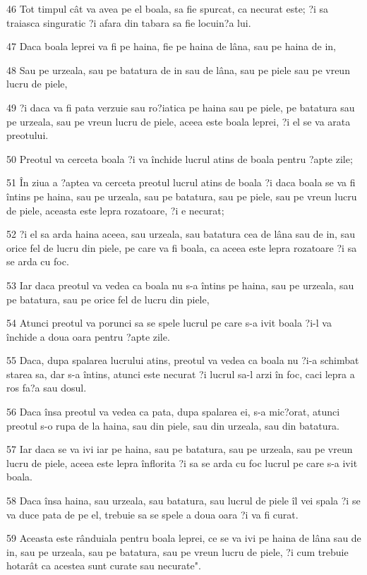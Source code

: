 \par 46 Tot timpul cât va avea pe el boala, sa fie spurcat, ca necurat este; ?i sa traiasca singuratic ?i afara din tabara sa fie locuin?a lui.
\par 47 Daca boala leprei va fi pe haina, fie pe haina de lâna, sau pe haina de in,
\par 48 Sau pe urzeala, sau pe batatura de in sau de lâna, sau pe piele sau pe vreun lucru de piele,
\par 49 ?i daca va fi pata verzuie sau ro?iatica pe haina sau pe piele, pe batatura sau pe urzeala, sau pe vreun lucru de piele, aceea este boala leprei, ?i el se va arata preotului.
\par 50 Preotul va cerceta boala ?i va închide lucrul atins de boala pentru ?apte zile;
\par 51 În ziua a ?aptea va cerceta preotul lucrul atins de boala ?i daca boala se va fi întins pe haina, sau pe urzeala, sau pe batatura, sau pe piele, sau pe vreun lucru de piele, aceasta este lepra rozatoare, ?i e necurat;
\par 52 ?i el sa arda haina aceea, sau urzeala, sau batatura cea de lâna sau de in, sau orice fel de lucru din piele, pe care va fi boala, ca aceea este lepra rozatoare ?i sa se arda cu foc.
\par 53 Iar daca preotul va vedea ca boala nu s-a întins pe haina, sau pe urzeala, sau pe batatura, sau pe orice fel de lucru din piele,
\par 54 Atunci preotul va porunci sa se spele lucrul pe care s-a ivit boala ?i-l va închide a doua oara pentru ?apte zile.
\par 55 Daca, dupa spalarea lucrului atins, preotul va vedea ca boala nu ?i-a schimbat starea sa, dar s-a întins, atunci este necurat ?i lucrul sa-l arzi în foc, caci lepra a ros fa?a sau dosul.
\par 56 Daca însa preotul va vedea ca pata, dupa spalarea ei, s-a mic?orat, atunci preotul s-o rupa de la haina, sau din piele, sau din urzeala, sau din batatura.
\par 57 Iar daca se va ivi iar pe haina, sau pe batatura, sau pe urzeala, sau pe vreun lucru de piele, aceea este lepra înflorita ?i sa se arda cu foc lucrul pe care s-a ivit boala.
\par 58 Daca însa haina, sau urzeala, sau batatura, sau lucrul de piele îl vei spala ?i se va duce pata de pe el, trebuie sa se spele a doua oara ?i va fi curat.
\par 59 Aceasta este rânduiala pentru boala leprei, ce se va ivi pe haina de lâna sau de in, sau pe urzeala, sau pe batatura, sau pe vreun lucru de piele, ?i cum trebuie hotarât ca acestea sunt curate sau necurate".

